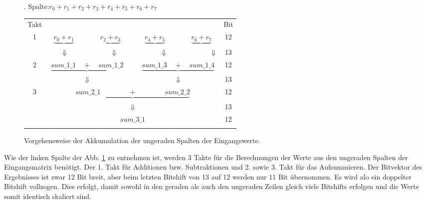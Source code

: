 \begin{figure}[htbp]
. Spalte:\quad $r_{0} + r_{1} + r_{2} + r_{3} + r_{4} + r_{5} + r_{6} + r_{7}$\\

\vspace{0.5cm}
\begin{tabular}{ccccccccc}
Takt&\multicolumn{6}{l}{ } & & Bit\\
1&$\underbrace{r_{0} + r_{1}}$ &  &$ \underbrace{r_{2} + r_{3}}$ &  &$\underbrace{r_{4} + r_{5}}$ &  &$\underbrace{r_{6} + r_{7}}$ & 12\\
&\multicolumn{7}{l}{$\hspace{0.65cm} \Downarrow \hspace{2.3cm} \Downarrow \hspace{2.3cm} \Downarrow \hspace{2.3cm}\Downarrow$}&13\\
2&\multicolumn{3}{c}{$\underbrace{sum\_1\_1 \quad + \quad sum\_1\_2}$} & & \multicolumn{3}{c}{$\underbrace{sum\_1\_3 \quad + \quad sum\_1\_4}$} & 12\\
&\multicolumn{3}{c}{$\Downarrow$} & & \multicolumn{3}{c}{$\Downarrow$}&13\\
3&\multicolumn{7}{c}{$\underbrace{sum\_2\_1 \quad  \quad \quad \quad + \quad \quad \quad  \quad sum\_2\_2}$} & 12\\
&\multicolumn{7}{c}{$\Downarrow$}&13\\
&\multicolumn{7}{c}{$sum\_3\_1$} & 12\\
&\end{tabular}
\caption{Vorgehensweise der Akkumulation der ungeraden Spalten der Eingangswerte.}
\label{pic:AkkumulationUngeradeSpalten}
\end{figure}

Wie der linken Spalte der Abb. \ref{pic:AkkumulationUngeradeSpalten} zu entnehmen ist, werden 3 Takte für die Berechnungen der Werte aus den ungeraden Spalten der Eingangsmatrix benötigt.
Der 1. Takt für Additionen bzw. Subtraktionen und 2. sowie 3. Takt für das Aufsummieren. Der Bitvektor des Ergebnisses ist zwar 12 Bit breit, aber beim letzten Bitshift von 13 auf 12
werden nur 11 Bit übernommen. Es wird alo ein doppelter Bitshift vollzogen. Dies erfolgt, damit sowohl in den geraden als auch den ungeraden Zeilen gleich viele Bitshifts erfolgen
und die Werte somit identisch skaliert sind.

